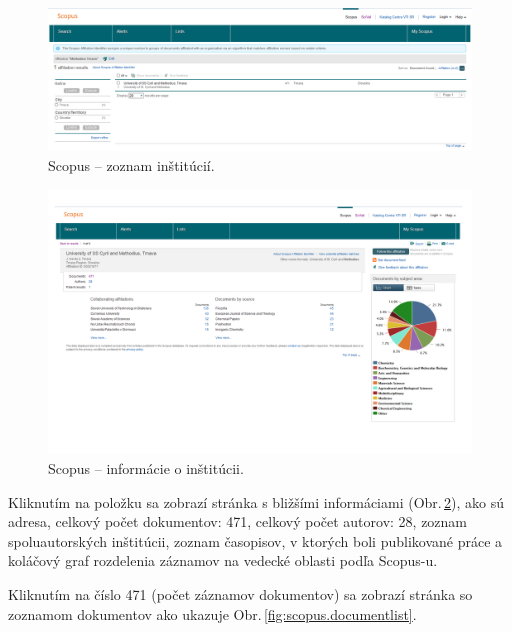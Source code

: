 \begin{figure}
  \centering
  \includegraphics[width=\textwidth]{obr/scopus02-cut.jpg}
  \caption{Scopus -- zoznam inštitúcií.}
  \label{fig:scopus.institutionlist}
\end{figure}

\begin{figure}
  \centering
  \includegraphics[width=\textwidth]{obr/scopus03-cut.jpg}
  \caption{Scopus -- informácie o inštitúcii.}
  \label{fig:scopus.institutioninfo}
\end{figure}

Kliknutím na položku sa zobrazí stránka s bližšími informáciami
(Obr.\,\ref{fig:scopus.institutioninfo}), ako sú adresa, celkový počet
dokumentov: 471, celkový počet autorov: 28, zoznam spoluautorských inštitúcii,
zoznam časopisov, v ktorých boli publikované práce a koláčový graf rozdelenia
záznamov na vedecké oblasti podľa Scopus-u.

Kliknutím na číslo 471 (počet záznamov dokumentov) sa zobrazí stránka so
zoznamom dokumentov ako ukazuje Obr.\,\ref{fig:scopus.documentlist}.

